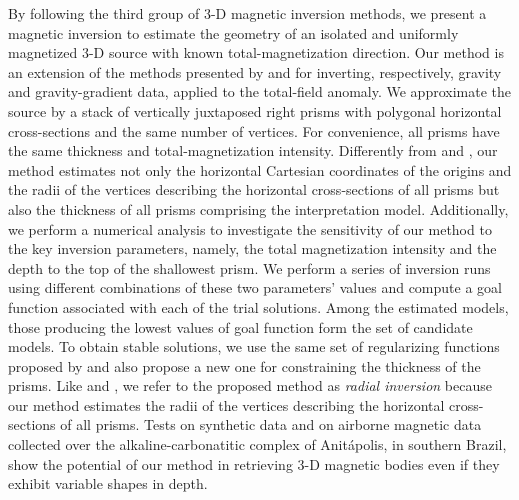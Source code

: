 By following the third group of 3-D magnetic inversion methods, 
we present a magnetic inversion to estimate the geometry of an isolated 
and uniformly magnetized 3-D source with known total-magnetization direction.
Our method is an extension of the methods presented 
by \cite{oliveirajr-etal2011} and \cite{oliveirajr-barbosa2013} for inverting, respectively, 
gravity and gravity-gradient data, applied to the total-field anomaly. 
We approximate the source by a stack of vertically juxtaposed 
right prisms with polygonal horizontal cross-sections and the same number of vertices.
For convenience, all prisms have the same thickness and total-magnetization 
intensity.
Differently from \cite{oliveirajr-etal2011} and \cite{oliveirajr-barbosa2013}, 
our method estimates not only the horizontal Cartesian coordinates of the origins and the radii of the vertices describing the horizontal cross-sections of all prisms but also the thickness of all prisms comprising the interpretation model. Additionally, we perform a numerical analysis to investigate the sensitivity of our method to the key inversion parameters, namely, the total magnetization intensity and the depth to the top 
of the shallowest prism. 
We perform a series of inversion runs using different combinations of these two parameters' values and compute a goal function associated with each of the trial solutions.
Among the estimated models, those producing the 
lowest values of goal function form the set of candidate models.
To obtain stable solutions, we use the same set of regularizing functions proposed by 
\cite{oliveirajr-etal2011} and also propose a new one for constraining the 
thickness of the prisms. 
Like \cite{oliveirajr-etal2011} and \cite{oliveirajr-barbosa2013}, we refer to the proposed method as \textit{radial inversion} because our method estimates the radii of the vertices describing the horizontal cross-sections of all prisms.
Tests on synthetic data and on airborne magnetic data collected over the alkaline-carbonatitic complex of Anit{\'a}polis, in southern Brazil, show the potential of our method in retrieving 3-D magnetic bodies even if they exhibit variable shapes in depth. 


